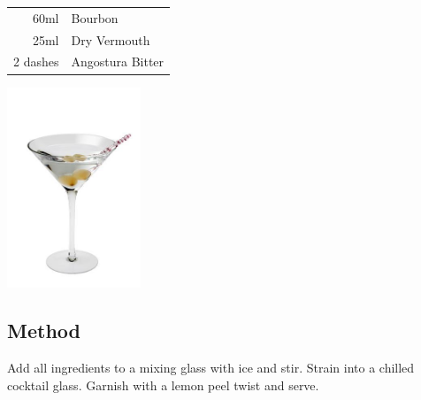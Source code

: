 \documentclass[12pt, letterpaper]{article}
\begin{document}
\begin{multicols}{2}

\begin{tabular} { r | l}
    60ml & Bourbon \\
    25ml & Dry Vermouth \\
    2 dashes & Angostura Bitter \\
\end{tabular}

\includegraphics[height=6cm]{gibson}

\end{multicols}

\subsection*{Method}
Add all ingredients to a mixing glass with ice and stir. Strain into a chilled cocktail glass. 
Garnish with a lemon peel twist and serve.
\end{document}
